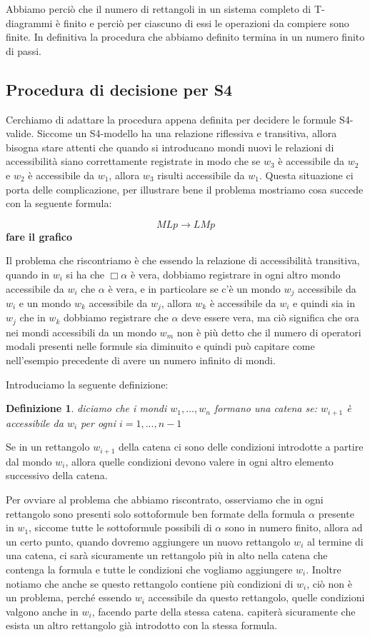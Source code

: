 \documentclass[a4paper, 12pt]{article}
\newtheorem{definition}{Definizione}
\begin{document}
Abbiamo perciò che il numero di rettangoli in un sistema completo di T-diagrammi è finito
e perciò per ciascuno di essi le operazioni da compiere sono finite. In definitiva
la procedura che abbiamo definito termina in un numero finito di passi.

\subsection{Procedura di decisione per S4}
Cerchiamo di adattare la procedura appena definita per decidere le formule S4-valide.
Siccome un S4-modello ha una relazione riflessiva e transitiva, allora bisogna stare
attenti che quando si introducano mondi nuovi le relazioni di accessibilità siano
correttamente registrate in modo che se $w_3$ è accessibile da $w_2$ e $w_2$ è accessibile
da $w_1$, allora $w_3$ risulti accessibile da $w_1$.
Questa situazione ci porta delle complicazione, per illustrare bene il problema
mostriamo cosa succede con la seguente formula:

$$MLp \rightarrow LMp$$
\textbf{fare il grafico}

Il problema che riscontriamo è che essendo la relazione di accessibilità transitiva,
quando in $w_i$ si ha che $\Box \alpha$ è vera, dobbiamo registrare in ogni altro mondo
accessibile da $w_i$ che $\alpha$ è vera, e in particolare se c'è un mondo $w_j$
accessibile da $w_i$ e un mondo $w_k$ accessibile da $w_j$, allora $w_k$ è accessibile
da $w_i$ e quindi sia in $w_j$ che in $w_k$ dobbiamo registrare che $\alpha$ deve essere vera,
ma ciò significa che ora nei mondi accessibili da un mondo $w_m$ non è più detto
che il numero di operatori modali presenti nelle formule sia diminuito e quindi
può capitare come nell'esempio precedente di avere un numero infinito di mondi.

Introduciamo la seguente definizione:
\begin{definition}
diciamo che i mondi $w_1, ..., w_n$ formano una catena se:
$w_{i+1}$ è accessibile da $w_i$ per ogni $i = 1, ..., n-1$
\end{definition}

Se in un rettangolo $w_{i+1}$ della catena ci sono delle condizioni introdotte
a partire dal mondo $w_i$, allora quelle condizioni devono valere
in ogni altro elemento successivo della catena.

Per ovviare al problema che abbiamo riscontrato, osserviamo che
in ogni rettangolo sono presenti solo
sottoformule ben formate della formula $\alpha$ presente in $w_1$,
siccome tutte le sottoformule possibili di $\alpha$ sono in numero finito,
allora ad un certo punto, quando dovremo aggiungere un nuovo rettangolo $w_i$
al termine di una catena, ci sarà sicuramente un rettangolo più in alto nella catena
che contenga la formula e tutte le condizioni che vogliamo aggiungere $w_i$.
Inoltre notiamo che anche se questo rettangolo contiene più condizioni di $w_i$,
ciò non è un problema, perché essendo $w_i$ accessibile da questo rettangolo,
quelle condizioni valgono anche in $w_i$, facendo parte della stessa catena.
capiterà sicuramente che esista un altro rettangolo già introdotto
con la stessa formula.
\end{document}
